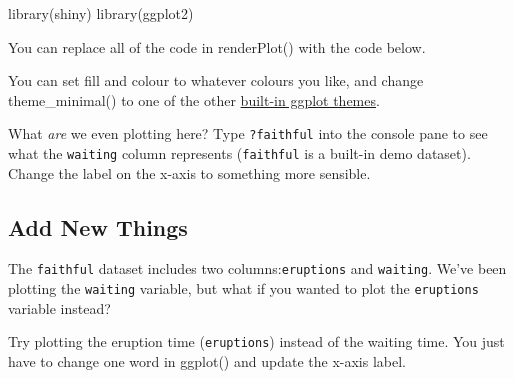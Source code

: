 \documentclass[
]{book}
\newenvironment{Shaded}{\begin{snugshade}}{\end{snugshade}}
\newcommand{\AttributeTok}[1]{\textcolor[rgb]{0.77,0.63,0.00}{#1}}
\newcommand{\CommentTok}[1]{\textcolor[rgb]{0.56,0.35,0.01}{\textit{#1}}}
\newcommand{\FunctionTok}[1]{\textcolor[rgb]{0.00,0.00,0.00}{#1}}
\newcommand{\NormalTok}[1]{#1}
\newcommand{\OtherTok}[1]{\textcolor[rgb]{0.56,0.35,0.01}{#1}}
\newcommand{\SpecialCharTok}[1]{\textcolor[rgb]{0.00,0.00,0.00}{#1}}
\newcommand{\StringTok}[1]{\textcolor[rgb]{0.31,0.60,0.02}{#1}}
\begin{document}
\begin{Shaded}
\begin{Highlighting}[]
\FunctionTok{library}\NormalTok{(shiny)}
\FunctionTok{library}\NormalTok{(ggplot2)}
\end{Highlighting}
\end{Shaded}

You can replace all of the code in renderPlot() with the code below.

\begin{Shaded}
\end{Shaded}

You can set fill and colour to whatever colours you like, and change theme\_minimal() to one of the other \href{https://ggplot2.tidyverse.org/reference/ggtheme.html\#examples}{built-in ggplot themes}.

What \emph{are} we even plotting here? Type \texttt{?faithful} into the console pane to see what the \texttt{waiting} column represents (\texttt{faithful} is a built-in demo dataset). Change the label on the x-axis to something more sensible.

\hypertarget{add-new-things}{%
\subsection{Add New Things}\label{add-new-things}}

The \texttt{faithful} dataset includes two columns:\texttt{eruptions} and \texttt{waiting}. We've been plotting the \texttt{waiting} variable, but what if you wanted to plot the \texttt{eruptions} variable instead?

Try plotting the eruption time (\texttt{eruptions}) instead of the waiting time. You just have to change one word in ggplot() and update the x-axis label.
\end{document}
